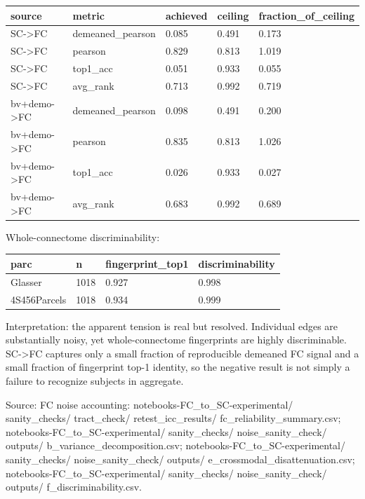 {\def\LTcaptype{none} %
\begin{longtable}[]{@{}lllll@{}}
\toprule\noalign{}
source & metric & achieved & ceiling & fraction\_of\_ceiling \\
\midrule\noalign{}
\endhead
\bottomrule\noalign{}
\endlastfoot
SC-\textgreater FC & demeaned\_pearson & 0.085 & 0.491 & 0.173 \\
SC-\textgreater FC & pearson & 0.829 & 0.813 & 1.019 \\
SC-\textgreater FC & top1\_acc & 0.051 & 0.933 & 0.055 \\
SC-\textgreater FC & avg\_rank & 0.713 & 0.992 & 0.719 \\
bv+demo-\textgreater FC & demeaned\_pearson & 0.098 & 0.491 & 0.200 \\
bv+demo-\textgreater FC & pearson & 0.835 & 0.813 & 1.026 \\
bv+demo-\textgreater FC & top1\_acc & 0.026 & 0.933 & 0.027 \\
bv+demo-\textgreater FC & avg\_rank & 0.683 & 0.992 & 0.689 \\
\end{longtable}
}

Whole-connectome discriminability:

{\def\LTcaptype{none} %
\begin{longtable}[]{@{}llll@{}}
\toprule\noalign{}
parc & n & fingerprint\_top1 & discriminability \\
\midrule\noalign{}
\endhead
\bottomrule\noalign{}
\endlastfoot
Glasser & 1018 & 0.927 & 0.998 \\
4S456Parcels & 1018 & 0.934 & 0.999 \\
\end{longtable}
}

Interpretation: the apparent tension is real but resolved. Individual edges are substantially noisy, yet whole-connectome fingerprints are highly discriminable. SC-\textgreater FC captures only a small fraction of reproducible demeaned FC signal and a small fraction of fingerprint top-1 identity, so the negative result is not simply a failure to recognize subjects in aggregate.

Source: FC noise accounting: notebooks-FC\_to\_SC-experimental/ sanity\_checks/ tract\_check/ retest\_icc\_results/ fc\_reliability\_summary.csv; notebooks-FC\_to\_SC-experimental/ sanity\_checks/ noise\_sanity\_check/ outputs/ b\_variance\_decomposition.csv; notebooks-FC\_to\_SC-experimental/ sanity\_checks/ noise\_sanity\_check/ outputs/ e\_crossmodal\_disattenuation.csv; notebooks-FC\_to\_SC-experimental/ sanity\_checks/ noise\_sanity\_check/ outputs/ f\_discriminability.csv.


